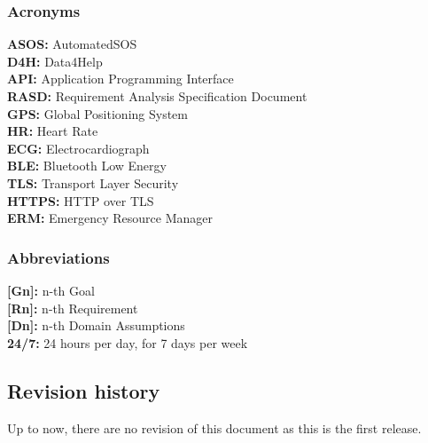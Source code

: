 \begin{flushleft}
\paragraph{}

{\color{Blue}\subsubsection{Acronyms}}
\textbf{ASOS:} AutomatedSOS\\
\textbf{D4H:} Data4Help\\
\textbf{API:} Application Programming Interface\\
\textbf{RASD:} Requirement Analysis Specification Document \\
\textbf{GPS:} Global Positioning System\\
\textbf{HR:} Heart Rate\\
\textbf{ECG:} Electrocardiograph\\
\textbf{BLE:} Bluetooth Low Energy\\
\textbf{TLS:} Transport Layer Security\\
\textbf{HTTPS:} HTTP over TLS\\
\textbf{ERM:} Emergency Resource Manager\\
\paragraph{}

{\color{Blue}\subsubsection{Abbreviations}}
\textbf{[Gn]:} n-th Goal\\
\textbf{[Rn]:} n-th Requirement\\
\textbf{[Dn]:} n-th Domain Assumptions\\
\textbf{24/7:} 24 hours per day, for 7 days per week \\
\paragraph{}

{\color{Blue}\subsection{Revision history}}
Up to now, there are no revision of this document as this is the first release.\\
\paragraph{}


\end{flushleft}
